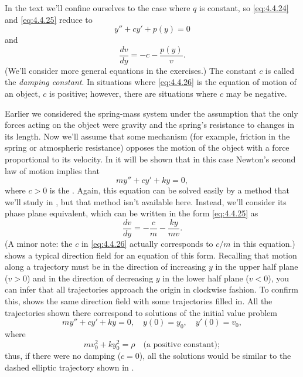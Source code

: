In the text we'll confine ourselves to the case where $q$
is constant, so \eqref{eq:4.4.24} and \eqref{eq:4.4.25}  reduce to
\begin{equation} \label{eq:4.4.26}
y''+cy'+p(y)=0
\end{equation}
and
\[
\frac{dv}{dy}=-c-\frac{p(y)}{v}.
\]
(We'll consider more general equations in the exercises.) The constant
$c$ is called the
\emph{\color{blue}damping constant}.
In situations where
\eqref{eq:4.4.26} is the equation of motion of an object, $c$ is positive;
however, there are situations where  $c$ may be negative.



Earlier we considered
the spring-mass system under the assumption that the only forces
acting on the object were gravity and the spring's resistance to
changes in its length. Now we'll assume that some mechanism (for
example, friction in the spring or atmospheric resistance) opposes the
motion of the object with a force proportional to its velocity. In
 it will be shown that in this case Newton's
second law of motion implies that
\begin{equation} \label{eq:4.4.27}
my''+cy'+ky=0,
\end{equation}
where $c>0$ is the . Again, this
equation can
be solved easily by a method that we'll study in ,
but that method isn't available here. Instead, we'll consider its
phase plane equivalent, which can be written in the form \eqref{eq:4.4.25}
as
\begin{equation} \label{eq:4.4.28}
\frac{dv}{dy}=-\frac{c}{m}-\frac{ky}{mv}.
\end{equation}
(A minor note: the $c$ in \eqref{eq:4.4.26} actually corresponds to
$c/m$ in this equation.)  shows a
typical direction field for an equation of this form. Recalling that
motion along a trajectory must be in the direction of increasing $y$
in the upper half plane ($v>0$) and in the direction of decreasing $y$
in the lower half plane ($v<0$), you can infer that all trajectories
approach the origin in clockwise fashion. To confirm this,
 shows the same direction field with some
trajectories filled in. All the trajectories shown there correspond to
solutions of the initial value problem
\[
my''+cy'+ky=0,\quad y(0)=y_0,\quad y'(0)=v_0,
\]
where
\[
mv_0^2+ky_0^2=\rho\quad\text{(a positive constant)};
\]
thus, if there were no damping ($c=0$),  all the solutions would
be similar to the dashed elliptic trajectory shown in
.

